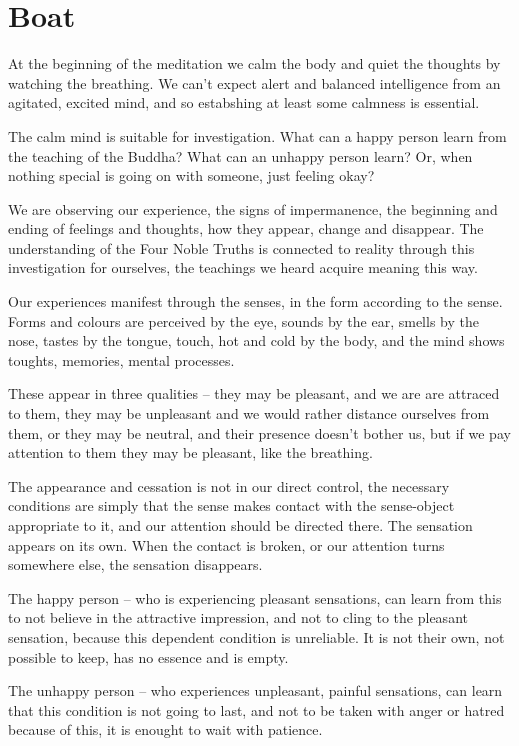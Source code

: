 \hypertarget{boat-1}{%
\chapter{Boat}\label{boat-1}}

At the beginning of the meditation we calm the body and quiet the
thoughts by watching the breathing. We can't expect alert and balanced
intelligence from an agitated, excited mind, and so estabshing at least
some calmness is essential.

The calm mind is suitable for investigation. What can a happy person
learn from the teaching of the Buddha? What can an unhappy person learn?
Or, when nothing special is going on with someone, just feeling okay?

We are observing our experience, the signs of impermanence, the
beginning and ending of feelings and thoughts, how they appear, change
and disappear. The understanding of the Four Noble Truths is connected
to reality through this investigation for ourselves, the teachings we
heard acquire meaning this way.

Our experiences manifest through the senses, in the form according to
the sense. Forms and colours are perceived by the eye, sounds by the
ear, smells by the nose, tastes by the tongue, touch, hot and cold by
the body, and the mind shows toughts, memories, mental processes.

These appear in three qualities -- they may be pleasant, and we are are
attraced to them, they may be unpleasant and we would rather distance
ourselves from them, or they may be neutral, and their presence doesn't
bother us, but if we pay attention to them they may be pleasant, like
the breathing.

The appearance and cessation is not in our direct control, the necessary
conditions are simply that the sense makes contact with the sense-object
appropriate to it, and our attention should be directed there. The
sensation appears on its own. When the contact is broken, or our
attention turns somewhere else, the sensation disappears.

The happy person -- who is experiencing pleasant sensations, can learn
from this to not believe in the attractive impression, and not to cling
to the pleasant sensation, because this dependent condition is
unreliable. It is not their own, not possible to keep, has no essence
and is empty.

The unhappy person -- who experiences unpleasant, painful sensations,
can learn that this condition is not going to last, and not to be taken
with anger or hatred because of this, it is enought to wait with
patience.

